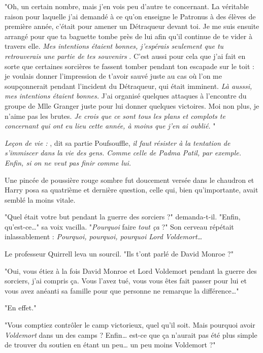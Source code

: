 "Oh, un certain nombre, mais j'en vois peu d'autre te concernant. La véritable raison pour laquelle j'ai demandé à ce qu'on enseigne le Patronus à des élèves de première année, c'était pour amener un Détraqueur devant toi. Je me suis ensuite arrangé pour que ta baguette tombe près de lui afin qu'il continue de te vider à travers elle. \emph{Mes intentions étaient bonnes, j'espérais seulement que tu retrouverais une partie de tes souvenirs} . C'est aussi pour cela que j'ai fait en sorte que certaines sorcières te fassent tomber pendant ton escapade sur le toit : je voulais donner l'impression de t'avoir sauvé juste au cas où l'on me soupçonnerait pendant l'incident du Détraqueur, qui était imminent. \emph{Là ausssi, mes intentions étaient bonnes.}  J'ai organisé quelques attaques à l'encontre du groupe de Mlle Granger juste pour lui donner quelques victoires. Moi non plus, je n'aime pas les brutes. \emph{Je crois que ce sont tous les plans et complots te concernant qui ont eu lieu cette année, à moins que j'en ai oublié.} "

\emph{Leçon de vie :} , dit sa partie Poufsouffle, \emph{il faut résister à la tentation de s'immiscer dans la vie des gens. Comme celle de Padma Patil, par exemple. Enfin, si on ne veut pas finir comme lui.} 

Une pincée de poussière rouge sombre fut doucement versée dans le chaudron et Harry posa sa quatrième et dernière question, celle qui, bien qu'importante, avait semblé la moins vitale.

"Quel était votre but pendant la guerre des sorciers ?" demanda-t-il. "Enfin, qu'est-ce…" sa voix vacilla. "\emph{Pourquoi}  faire \emph{tout ça}  ?" Son cerveau répétait inlassablement : \emph{Pourquoi, pourquoi, pourquoi Lord Voldemort…} 

Le professeur Quirrell leva un sourcil. "Ils t'ont parlé de David Monroe ?"

"Oui, vous étiez à la fois David Monroe et Lord Voldemort pendant la guerre des sorciers, j'ai compris ça. Vous l'avez tué, vous vous êtes fait passer pour lui et vous avez anéanti sa famille pour que personne ne remarque la différence…"

"En effet."

"Vous comptiez contrôler le camp victorieux, quel qu'il soit. Mais pourquoi avoir \emph{Voldemort}  dans un des camps ? Enfin… est-ce que ça n'aurait pas été plus simple de trouver du soutien en étant un peu… un peu moins Voldemort ?"

